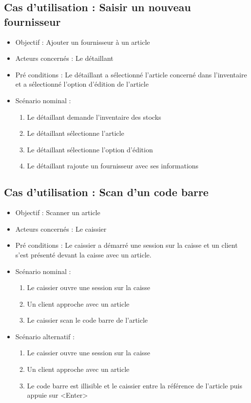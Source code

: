 \subsection{Cas d'utilisation : Saisir un nouveau fournisseur}
\begin{itemize}
	\item Objectif : Ajouter un fournisseur à un article
	\item Acteurs concernés : Le détaillant
	\item Pré conditions : Le détaillant a sélectionné l'article concerné dans l'inventaire et a sélectionné l'option d'édition de l'article
	\item Scénario nominal :
	\begin{enumerate}
		\item Le détaillant demande l'inventaire des stocks
		\item Le détaillant sélectionne l'article
		\item Le détaillant sélectionne l'option d'édition
		\item Le détaillant rajoute un fournisseur avec ses informations
	\end{enumerate}
\end{itemize}

\subsection{Cas d'utilisation : Scan d'un code barre}
\begin{itemize}
	\item Objectif : Scanner un article
	\item Acteurs concernés : Le caissier
	\item Pré conditions : Le caissier a démarré une session sur la caisse et un client s'est présenté devant la caisse avec un article.
	\item Scénario nominal :
	\begin{enumerate}
		\item Le caissier ouvre une session sur la caisse
		\item Un client approche avec un article
		\item Le caissier scan le code barre de l'article
	\end{enumerate}
	
	\item Scénario alternatif :
	\begin{enumerate}
		\item Le caissier ouvre une session sur la caisse
		\item Un client approche avec un article
		\item Le code barre est illisible et le caissier entre la référence de l'article puis appuie sur <Enter>
	\end{enumerate}
\end{itemize}

